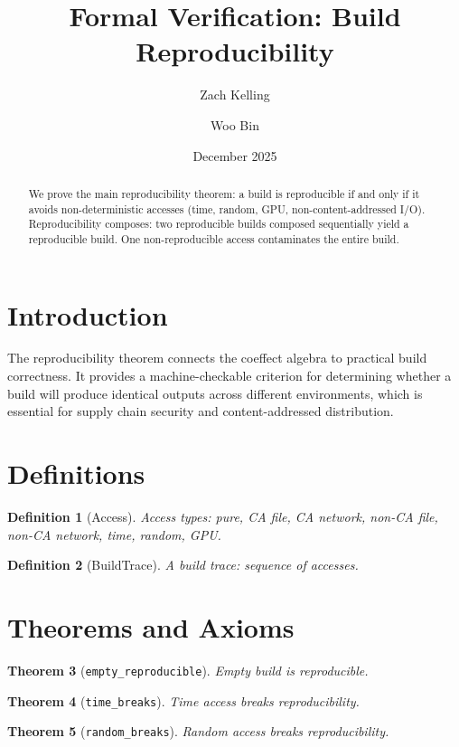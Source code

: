 \documentclass[11pt]{article}
\title{Formal Verification: Build Reproducibility}
\author{Zach Kelling \and Woo Bin}
\date{December 2025}
\newtheorem{theorem}{Theorem}
\newtheorem{definition}[theorem]{Definition}
\begin{document}
\maketitle

\begin{abstract}
We prove the main reproducibility theorem: a build is reproducible if and only if it avoids non-deterministic accesses (time, random, GPU, non-content-addressed I/O). Reproducibility composes: two reproducible builds composed sequentially yield a reproducible build. One non-reproducible access contaminates the entire build.
\end{abstract}

\section{Introduction}
The reproducibility theorem connects the coeffect algebra to practical build correctness. It provides a machine-checkable criterion for determining whether a build will produce identical outputs across different environments, which is essential for supply chain security and content-addressed distribution.

\section{Definitions}
\begin{definition}[Access]
Access types: pure, CA file, CA network, non-CA file, non-CA network, time, random, GPU.
\end{definition}

\begin{definition}[BuildTrace]
A build trace: sequence of accesses.
\end{definition}


\section{Theorems and Axioms}
\begin{theorem}[\texttt{empty\_reproducible}]
Empty build is reproducible.
\end{theorem}

\begin{theorem}[\texttt{time\_breaks}]
Time access breaks reproducibility.
\end{theorem}

\begin{theorem}[\texttt{random\_breaks}]
Random access breaks reproducibility.
\end{theorem}
\end{document}
